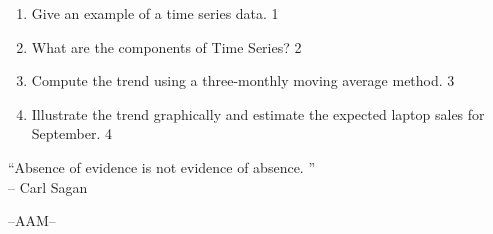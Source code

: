 \documentclass[12pt]{article}
\begin{document}
\begin{enumerate}
\begin{enumerate}
    \item Give an example of a time series data. \hfill 1
    \item What are the components of Time Series?   \hfill 2
  \item  
  Compute the trend using a three-monthly moving average method. \hfill 3
  \item
  Illustrate the trend graphically and estimate the expected laptop sales for September. \hfill 4
\end{enumerate}
  
\end{enumerate}

 \vspace{2.5cm}

\begin{center}
 “Absence of evidence is not evidence of absence. ” \\ -- Carl Sagan
 

  
  \vfill
  --AAM--
\end{center}


\newpage
\setcounter{page}{1}
\end{document}
